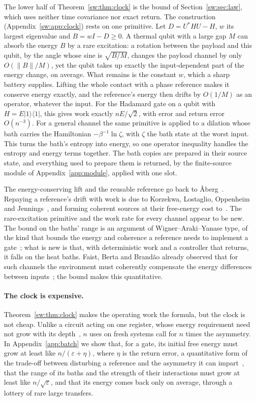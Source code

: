 The lower half of Theorem~\ref{sw:thm:clock} is the bound of Section~\ref{sw:sec:law}, which uses neither time covariance nor exact return. The construction (Appendix~\ref{sw:app:clock}) rests on one primitive. Let $D=U^*HU-H$, $w$ its largest eigenvalue and $B=wI-D\ge0$. A thermal qubit with a large gap $M$ can absorb the energy $B$ by a rare excitation: a rotation between the payload and this qubit, by the angle whose sine is $\sqrt{B/M}$, changes the payload channel by only $O(\|B\|/M)$, yet the qubit takes up exactly the input-dependent part of the energy change, on average. What remains is the constant $w$, which a sharp battery supplies. Lifting the whole contact with a phase reference makes it conserve energy exactly, and the reference's energy then drifts by $O(1/M)$ as an operator, whatever the input. For the Hadamard gate on a qubit with $H=E|1\rangle\langle1|$, this gives work exactly $nE/\sqrt2$, with error and return error $O(n^{-3})$. For a general channel the same primitive is applied to a dilation whose bath carries the Hamiltonian $-\beta^{-1}\ln\zeta$, with $\zeta$ the bath state at the worst input. This turns the bath's entropy into energy, so one operator inequality handles the entropy and energy terms together. The bath copies are prepared in their source state, and everything used to prepare them is returned, by the finite-source module of Appendix~\ref{app:module}, applied with one slot.

The energy-conserving lift and the reusable reference go back to {\AA}berg~\cite{Aberg14}. Repaying a reference's drift with work is due to Korzekwa, Lostaglio, Oppenheim and Jennings~\cite{KLOJ16}, and forming coherent sources at their free-energy cost to~\cite{Brandao13,KLOJ16}. The rare-excitation primitive and the work rate for every channel appear to be new. The bound on the baths' range is an argument of Wigner--Araki--Yanase type, of the kind that bounds the energy and coherence a reference needs to implement a gate~\cite{ChiribellaYangRenner21,TSS20}; what is new is that, with deterministic work and a controller that returns, it falls on the heat baths. Faist, Berta and Brand\~ao already observed that for such channels the environment must coherently compensate the energy differences between inputs~\cite{FBB19}; the bound makes this quantitative.

\paragraph{The clock is expensive.} Theorem~\ref{sw:thm:clock} makes the operating work the formula, but the clock is not cheap. Unlike a circuit acting on one register, whose energy requirement need not grow with its depth~\cite{ChiribellaYangRenner21}, $n$ uses on fresh systems call for $n$ times the asymmetry. In Appendix~\ref{app:batch} we show that, for a gate, its initial free energy must grow at least like $n/(\varepsilon+\eta)$, where $\eta$ is the return error, a quantitative form of the trade-off between disturbing a reference and the asymmetry it can impart~\cite{MarvianSpekkens19}, that the range of its baths and the strength of their interactions must grow at least like $n/\sqrt\varepsilon$, and that its energy comes back only on average, through a lottery of rare large transfers.

